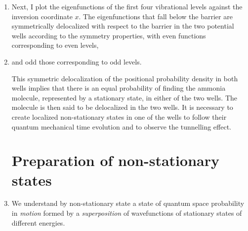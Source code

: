 \documentclass[12pt, a4paper]{article}
\begin{document}
\begin{enumerate}[label=\textbf{Slide \arabic*.}]
    \item Next, I plot the eigenfunctions of the first four vibrational levels against the inversion coordinate $x$. The eigenfunctions that fall below the barrier are symmetrically delocalized with respect to the barrier in the two potential wells according to the symmetry properties, with even functions corresponding to even levels,

    \item and odd those corresponding to odd levels.

        This symmetric delocalization of the positional probability density in both wells implies that there is an equal probability of finding the ammonia molecule, represented by a stationary state, in either of the two wells. The molecule is then said to be delocalized in the two wells. It is necessary to create localized non-stationary states in one of the wells to follow their quantum mechanical time evolution and to observe the tunnelling effect.

        \section{Preparation of non-stationary states}

    \item We understand by non-stationary state a state of quantum space probability in \textit{motion} formed by a \textit{superposition} of wavefunctions of stationary states of different energies.


\end{enumerate}
\end{document}
